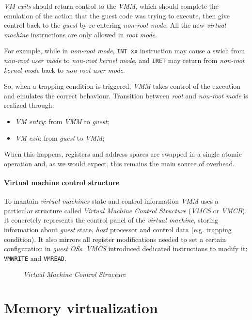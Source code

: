 \emph{VM exits} should return control to the \emph{VMM}, which should complete
the emulation of the action that the guest code was trying to execute, then
give control back to the \emph{guest} by re-entering \emph{non-root mode}. All
the new \emph{virtual machine} instructions are only allowed in \emph{root mode}.

For example, while in \emph{non-root mode}, \texttt{INT xx} instruction may cause
a swich from \emph{non-root user mode} to \emph{non-root kernel mode}, and
\texttt{IRET} may return from \emph{non-root kernel mode} back to \emph{non-root
user mode}.

\bigskip\noindent
So, when a trapping condition is triggered, \emph{VMM} takes control of the
execution and emulates the correct behaviour. Transition between \emph{root}
and \emph{non-root mode} is realized through:
\begin{itemize}
    \item\emph{VM entry}: from \emph{VMM} to \emph{guest};
    \item\emph{VM exit}: from \emph{guest} to \emph{VMM};
\end{itemize}\noindent
When this happens, registers and address spaces are swapped in a single atomic
operation and, as we would expect, this remains the main source of overhead.

\paragraph{Virtual machine control structure}
To mantain \emph{virtual machines} state and control information \emph{VMM}
uses a particular structure called \emph{Virtual Machine Control Structure}
(\emph{VMCS} or \emph{VMCB}). It concretely represents the control panel of
the \emph{virtual machine}, storing information about \emph{guest} state,
\emph{host} processor and control data (e.g. trapping condition). It also
mirrors all register modifications needed to set a certain configuration in
\emph{guest OSs}. \emph{VMCS} introduced dedicated instructions to modify it:
\texttt{VMWRITE} and \texttt{VMREAD}.

\begin{figure}[h!]
    \centering
    \caption{\emph{Virtual Machine Control Structure}}
\end{figure}

\section{Memory virtualization}
